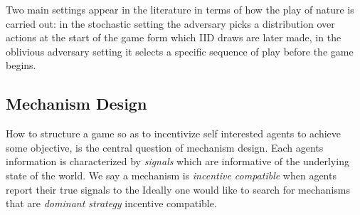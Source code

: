 Two main settings appear in the literature in terms of how the play of nature is carried out: in the stochastic setting the adversary picks a distribution over actions at the start of the game form which IID draws are later made, in the oblivious adversary setting it selects a specific sequence of play before the game begins.



\subsection{Mechanism Design}

How to structure a game so as to incentivize self interested agents to achieve some objective, is the central question of mechanism design.
Each agents information is characterized by \emph{signals} which are informative of the underlying state of the world. 
We say a mechanism is \emph{incentive compatible} when agents report their true signals to the 
Ideally one would like to search for mechanisms that are  \emph{dominant strategy} incentive compatible. 





